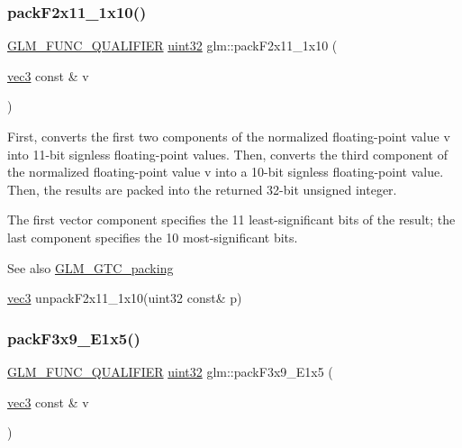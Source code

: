 \subsubsection{\texorpdfstring{pack\+F2x11\+\_\+1x10()}{packF2x11\_1x10()}}
{\footnotesize\ttfamily \mbox{\hyperlink{setup_8hpp_a33fdea6f91c5f834105f7415e2a64407}{G\+L\+M\+\_\+\+F\+U\+N\+C\+\_\+\+Q\+U\+A\+L\+I\+F\+I\+ER}} \mbox{\hyperlink{group__gtc__type__precision_ga202b6a53c105fcb7e531f9b443518451}{uint32}} glm\+::pack\+F2x11\+\_\+1x10 (\begin{DoxyParamCaption}\item[{\mbox{\hyperlink{group__core__types_ga1c47e8b3386109bc992b6c48e91b0be7}{vec3}} const \&}]{v }\end{DoxyParamCaption})}

First, converts the first two components of the normalized floating-\/point value v into 11-\/bit signless floating-\/point values. Then, converts the third component of the normalized floating-\/point value v into a 10-\/bit signless floating-\/point value. Then, the results are packed into the returned 32-\/bit unsigned integer.

The first vector component specifies the 11 least-\/significant bits of the result; the last component specifies the 10 most-\/significant bits.

\begin{DoxySeeAlso}{See also}
\mbox{\hyperlink{group__gtc__packing}{G\+L\+M\+\_\+\+G\+T\+C\+\_\+packing}} 

\mbox{\hyperlink{group__core__types_ga1c47e8b3386109bc992b6c48e91b0be7}{vec3}} unpack\+F2x11\+\_\+1x10(uint32 const\& p) 
\end{DoxySeeAlso}
\mbox{\label{group__gtc__packing_ga0984f9598edc648d59a9643d9a61b121}} 
\subsubsection{\texorpdfstring{pack\+F3x9\+\_\+\+E1x5()}{packF3x9\_E1x5()}}
{\footnotesize\ttfamily \mbox{\hyperlink{setup_8hpp_a33fdea6f91c5f834105f7415e2a64407}{G\+L\+M\+\_\+\+F\+U\+N\+C\+\_\+\+Q\+U\+A\+L\+I\+F\+I\+ER}} \mbox{\hyperlink{group__gtc__type__precision_ga202b6a53c105fcb7e531f9b443518451}{uint32}} glm\+::pack\+F3x9\+\_\+\+E1x5 (\begin{DoxyParamCaption}\item[{\mbox{\hyperlink{group__core__types_ga1c47e8b3386109bc992b6c48e91b0be7}{vec3}} const \&}]{v }\end{DoxyParamCaption})}

